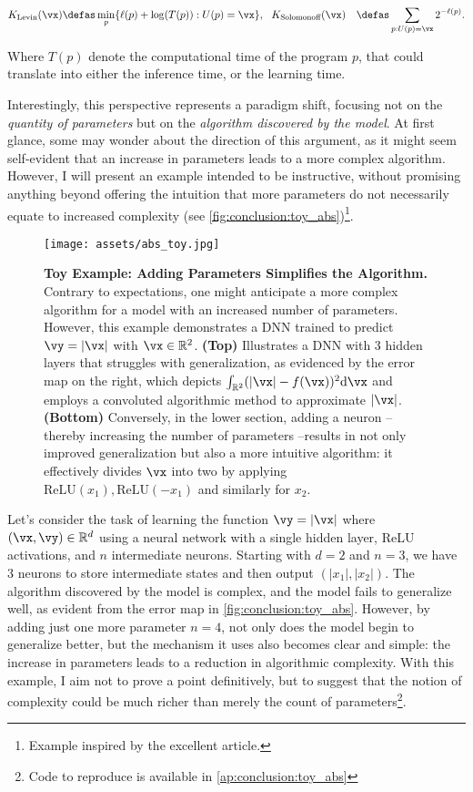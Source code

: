 \begin{align}
K_{\text{Levin}}(\vx) &\defas \min_{p} \{ \ell(p) + \log(T(p)) : U(p) = \vx \}, ~~
K_{\text{Solomonoff}}(\vx) &\defas \sum_{p : U(p) = \vx} 2^{-\ell(p)}. \nonumber
\end{align}

Where $T(p)$ denote the computational time of the program $p$, that could translate into either the inference time, or the learning time.

Interestingly, this perspective represents a paradigm shift, focusing not on the \textit{quantity of parameters} but on the \textit{algorithm discovered by the model}. At first glance, some may wonder about the direction of this argument, as it might seem self-evident that an increase in parameters leads to a more complex algorithm. However, I will present an example intended to be instructive, without promising anything beyond offering the intuition that more parameters do not necessarily equate to increased complexity (see \autoref{fig:conclusion:toy_abs})\footnote{Example inspired by the excellent \cite{elhage2022superposition} article.}.

\begin{figure}[ht]
    \centering
    \texttt{[image: assets/abs\_toy.jpg]}
    \caption{\textbf{Toy Example: Adding Parameters Simplifies the Algorithm.} Contrary to expectations, one might anticipate a more complex algorithm for a model with an increased number of parameters. However, this example demonstrates a DNN trained to predict $\vy = |\vx|$ with $\vx \in \mathbb{R}^2$. \textbf{(Top)} Illustrates a DNN with 3 hidden layers that struggles with generalization, as evidenced by the error map on the right, which depicts $\int_{\mathbb{R}^2}(|\vx| - f(\vx))^2 \mathrm{d} \vx$ and employs a convoluted algorithmic method to approximate $|\vx|$. \textbf{(Bottom)} Conversely, in the lower section, adding a neuron -- thereby increasing the number of parameters --results in not only improved generalization but also a more intuitive algorithm: it effectively divides $\vx$ into two by applying $\text{ReLU}(x_1), \text{ReLU}(-x_1)$ and similarly for $x_2$.}
    \label{fig:conclusion:toy_abs}
    \vspace{-4mm}
\end{figure}

Let's consider the task of learning the function $\vy = |\vx|$ where $(\vx, \vy) \in \mathbb{R}^d$ using a neural network with a single hidden layer, ReLU activations, and $n$ intermediate neurons. Starting with $d=2$ and $n=3$, we have 3 neurons to store intermediate states and then output $(|x_1|, |x_2|)$. The algorithm discovered by the model is complex, and the model fails to generalize well, as evident from the error map in \autoref{fig:conclusion:toy_abs}. However, by adding just one more parameter $n=4$, not only does the model begin to generalize better, but the mechanism it uses also becomes clear and simple: the increase in parameters leads to a reduction in algorithmic complexity. With this example, I aim not to prove a point definitively, but to suggest that the notion of complexity could be much richer than merely the count of parameters\footnote{Code to reproduce is available in \autoref{ap:conclusion:toy_abs}}.

